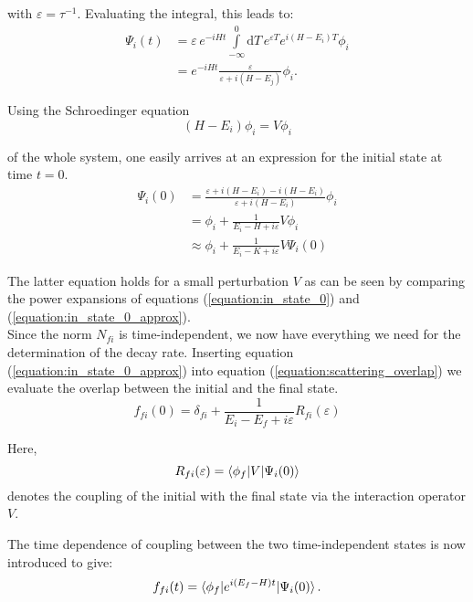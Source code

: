 with $\varepsilon = \tau^{-1}$. Evaluating the integral, this leads to:
\begin{align}
   \Psi_i(t) &= \varepsilon \, e^{-iHt} \int\limits_{-\infty}^0 \mathrm{d}T \,
                e^{\varepsilon T} e^{i(H-E_i)T} \phi_i\\
             &= e^{-iHt} \frac{\varepsilon}{\varepsilon+i(H-E_j)} \phi_i .
\end{align}

Using the Schroedinger equation
\begin{equation}
  (H-E_i) \phi_i = V \phi_i
\end{equation}

of the whole system, one easily arrives at an expression for the initial state
at time $t=0$.
\begin{align}
  \Psi_i(0) &= \frac{\varepsilon + i(H-E_i) - i(H-E_i)}{\varepsilon + i(H-E_i)} \phi_i\\
            &= \phi_i + \frac{1}{E_i-H+i\varepsilon} V \phi_i \label{equation:in_state_0}\\
            &\approx \phi_i + \frac{1}{E_i-K+i\varepsilon} V \Psi_i(0) \label{equation:in_state_0_approx}
\end{align}

The latter equation holds for a small perturbation $V$ as can be seen by comparing
the power expansions of equations (\ref{equation:in_state_0}) and
(\ref{equation:in_state_0_approx}).\\
Since the norm $N_{fi}$ is time-independent, we now have
everything we need for the determination of the decay rate.
Inserting equation (\ref{equation:in_state_0_approx}) into equation
(\ref{equation:scattering_overlap}) we evaluate the overlap between the initial
and the final state.
\begin{equation}
  f_{fi}(0) = \delta_{fi} + \frac{1}{E_i-E_f+i\varepsilon} R_{fi}(\varepsilon)
\end{equation}

Here, 
\begin{equation}
  R_{fi}(\varepsilon) = \braket{\phi_f|V|\Psi_i(0)}
\end{equation}
denotes the coupling of the initial with the final state via the interaction
operator $V$.

The time dependence of coupling between the two time-independent states is now
introduced to give:
\begin{equation}
  f_{fi}(t) = \braket{\phi_f| e^{i(E_f-H)t} |\Psi_i(0)} .
\end{equation}

